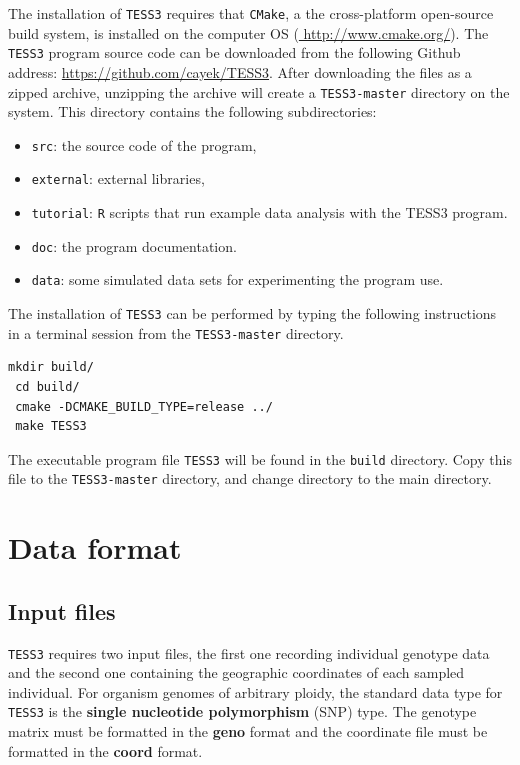 \documentclass[10pt,a4paper]{article}
\begin{document}
The installation of {\tt TESS3} requires that {\tt CMake}, a the cross-platform open-source build system, is installed on the computer OS (\url{ http://www.cmake.org/}).  The {\tt TESS3}  program source code can be downloaded from the following Github address: \url{https://github.com/cayek/TESS3}. After downloading the files as a zipped archive, unzipping the archive will create a {\tt TESS3-master} directory on the system. This  directory contains the following subdirectories:
\begin{itemize}
\item   {\tt src}: the source code of the program,

\item   {\tt external}: external libraries,

\item   {\tt tutorial}: {\tt R} scripts that run example data analysis with the TESS3 program.

\item     {\tt doc}: the program documentation.

\item     {\tt data}: some simulated data sets for experimenting the program use.
\end{itemize}
\noindent The installation of {\tt TESS3} can be performed by typing the following instructions in a terminal session from the {\tt TESS3-master} directory.

\begin{Verbatim}[frame = single]
 mkdir build/
 cd build/
 cmake -DCMAKE_BUILD_TYPE=release ../
 make TESS3
\end{Verbatim}

 \noindent The executable program file {\tt TESS3} will be found in the {\tt build} directory. Copy this file to the \verb|TESS3-master| directory, and change directory to the main directory.
  
\section{Data format}

\subsection{Input files}

{\tt TESS3} requires two input files, the first one recording individual genotype data and the second one containing the geographic coordinates of  each sampled individual. For organism genomes of arbitrary ploidy, the standard data type for {\tt TESS3} is the {\bf single nucleotide polymorphism} (SNP) type.  The genotype matrix must be formatted in the {\bf geno} format and the coordinate file must be formatted in the {\bf coord} format.
\end{document}
